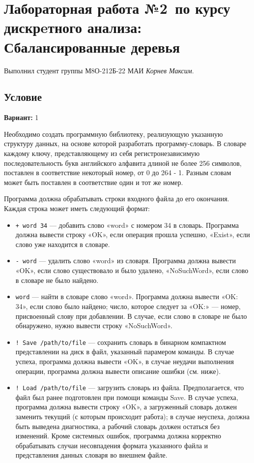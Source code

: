 \documentclass[12pt]{article}
\begin{document}
\section*{Лабораторная работа №2\, по курсу дискрeтного анализа: Сбалансированные деревья}

Выполнил студент группы М8О-212Б-22 МАИ \textit{Корнев Максим}.

\subsection*{Условие}

\textbf{Вариант:} 1

Необходимо создать программную библиотеку, реализующую указанную структуру данных, на основе которой разработать программу-словарь.
В словаре каждому ключу, представляющему из себя регистронезависимую последовательность букв английского алфавита длиной не более 256 символов,
поставлен в соответствие некоторый номер, от 0 до 264 - 1. Разным словам может быть поставлен в соответствие один и тот же номер.

Программа должна обрабатывать строки входного файла до его окончания. Каждая строка может иметь следующий формат:
\begin{itemize}
    \item \texttt{+ word 34} — добавить слово «word» с номером 34 в словарь. Программа должна вывести строку «OK», если операция прошла успешно,
    «Exist», если слово уже находится в словаре.

    \item \texttt{- word} — удалить слово «word» из словаря. Программа должна вывести «OK», если слово существовало и было удалено,
    «NoSuchWord», если слово в словаре не было найдено.

    \item \texttt{word} — найти в словаре слово «word». Программа должна вывести «OK: 34», если слово было найдено; число, которое следует за «OK:»
    — номер, присвоенный слову при добавлении. В случае, если слово в словаре не было обнаружено, нужно вывести строку «NoSuchWord».

    \item \texttt{! Save /path/to/file} — сохранить словарь в бинарном компактном представлении на диск в файл, указанный парамером команды.
    В случае успеха, программа должна вывести «OK», в случае неудачи выполнения операции, программа должна вывести описание ошибки (см. ниже).

    \item \texttt{! Load /path/to/file} — загрузить словарь из файла. Предполагается, что файл был ранее подготовлен при помощи команды Save. В случае успеха, программа должна вывести строку «OK», а загруженный словарь должен заменить текущий (с которым происходит работа); в случае неуспеха, должна быть выведена диагностика, а рабочий словарь должен остаться без изменений. Кроме системных ошибок, программа должна корректно обрабатывать случаи несовпадения формата указанного файла и представления данных словаря во внешнем файле.
\end{itemize}
\end{document}

